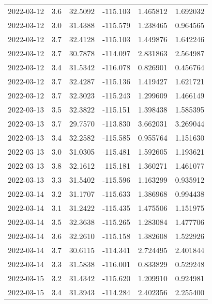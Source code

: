 \begin{tabular}{lrrrrr}
2022-03-12 &       3.6 &  32.5092 &  -115.103 &         1.465812 &         1.692032 \\
2022-03-12 &       3.0 &  31.4388 &  -115.579 &         1.238465 &         0.964565 \\
2022-03-12 &       3.7 &  32.4128 &  -115.103 &         1.449876 &         1.642246 \\
2022-03-12 &       3.7 &  30.7878 &  -114.097 &         2.831863 &         2.564987 \\
2022-03-12 &       3.4 &  31.5342 &  -116.078 &         0.826901 &         0.456764 \\
2022-03-12 &       3.7 &  32.4287 &  -115.136 &         1.419427 &         1.621721 \\
2022-03-12 &       3.7 &  32.3023 &  -115.243 &         1.299609 &         1.466149 \\
2022-03-13 &       3.5 &  32.3822 &  -115.151 &         1.398438 &         1.585395 \\
2022-03-13 &       3.7 &  29.7570 &  -113.830 &         3.662031 &         3.269044 \\
2022-03-13 &       3.4 &  32.2582 &  -115.585 &         0.955764 &         1.151630 \\
2022-03-13 &       3.0 &  31.0305 &  -115.481 &         1.592605 &         1.193621 \\
2022-03-13 &       3.8 &  32.1612 &  -115.181 &         1.360271 &         1.461077 \\
2022-03-13 &       3.3 &  31.5402 &  -115.596 &         1.163299 &         0.935912 \\
2022-03-14 &       3.2 &  31.1707 &  -115.633 &         1.386968 &         0.994438 \\
2022-03-14 &       3.1 &  31.2422 &  -115.435 &         1.475506 &         1.151975 \\
2022-03-14 &       3.5 &  32.3638 &  -115.265 &         1.283084 &         1.477706 \\
2022-03-14 &       3.6 &  32.2610 &  -115.158 &         1.382608 &         1.522926 \\
2022-03-14 &       3.7 &  30.6115 &  -114.341 &         2.724495 &         2.401844 \\
2022-03-14 &       3.3 &  31.5838 &  -116.001 &         0.833829 &         0.529248 \\
2022-03-15 &       3.2 &  31.4342 &  -115.620 &         1.209910 &         0.924981 \\
2022-03-15 &       3.4 &  31.3943 &  -114.284 &         2.402356 &         2.255400 \\

\end{tabular}

